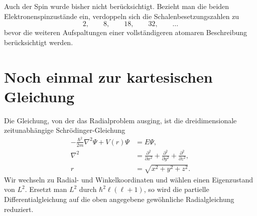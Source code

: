 Auch der Spin wurde bisher nicht berücksichtigt. Bezieht man die beiden Elektronenspinzustände ein, verdoppeln sich die Schalenbesetzungszahlen zu
\begin{equation}
2,\qquad 8,\qquad 18,\qquad 32,\qquad \ldots
\end{equation}
bevor die weiteren Aufspaltungen einer vollständigeren atomaren Beschreibung berücksichtigt werden.

\section{Noch einmal zur kartesischen Gleichung}

Die Gleichung, von der das Radialproblem ausging, ist die dreidimensionale zeitunabhängige Schr\"odinger-Gleichung
\begin{equation}
\begin{aligned}
-\frac{\hbar^2}{2m}\nabla^2\Psi+V(r)\Psi&=E\Psi,\\
\nabla^2&=\frac{\partial^2}{\partial x^2}
+\frac{\partial^2}{\partial y^2}
+\frac{\partial^2}{\partial z^2},\\
r&=\sqrt{x^2+y^2+z^2}.
\end{aligned}
\end{equation}
Wir wechseln zu Radial- und Winkelkoordinaten und wählen einen Eigenzustand von \(L^2\).
Ersetzt man \(L^2\) durch \(\hbar^2\ell(\ell+1)\), so wird die partielle Differentialgleichung auf die oben angegebene gewöhnliche Radialgleichung reduziert.

\begin{classroomqa}\end{classroomqa}

\begin{classroomqa}\end{classroomqa}

